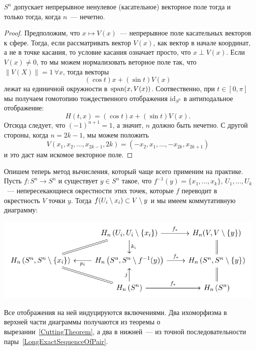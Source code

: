     \begin{theorem}
        $S^n$ допускает непрерывное ненулевое (касательное) векторное поле тогда и только тогда, когда $n$~--- нечетно.
    \end{theorem}
    
    \begin{proof}
        Предположим, что $x \mapsto V(x)$~--- непрерывное поле касательных векторов к сфере. Тогда,
        если рассматривать вектор $V(x)$, как вектор в начале координат, а не в точке касания, то условие касания означает просто, что
        $x \perp V(x)$. Если $V(x) \neq 0$, то мы можем нормализовать веторное поле так, что $\| V(X) \| = 1 \ \forall x$, тогда векторы
        \[ (\cos{t})x  + (\sin{t})V(x) \]
        лежат на единичной окружности в $\Span\lr*{x, V(x)}$.
        Соотвественно, при $t \in [0, \pi]$  мы получаем гомотопию тождественного отображения $\mathrm{id}_{S^n}$ в антиподальное отображение:
        \[ H(t, x) = (\cos{t})x  + (\sin{t})V(x). \]
        Отсюда следует, что $(-1)^{n + 1} = 1$, а значит, $n$ должно быть нечетно. С другой стороны, когда $n = 2k - 1$, мы можем положить
        \[ V(x_1, x_2, \ldots, x_{2k - 1}, 2k) = (-x_2, x_1, \ldots, - x_{2k}, x_{2 k + 1}) \]
        и это даст нам искомое векторное поле.
    \end{proof}

    Опишем теперь метод вычисления, который чаще всего применим на практике.
    Пусть $f\colon S^n \to S^n$ и существует $y \in S^n$ такое, что $f^{-1}(y) = \{ x_1, \ldots, x_k \}$,
    $U_1, \ldots, U_k$~---  непересекающиеся окрестности этих точек, которые $f$ переводит в  окрестность $V$ точки $y$.
    Тогда $f\lr*{U_i \setminus x_i} \subset V \setminus y$ и мы имеем коммутативную диаграмму:
    \begin{center}
        \includegraphics{lectures/0/pictures/cd_10}
    \end{center}

    Все отображения на ней индуцируются включениями. Два ихоморфизма в верхней части диаграммы получаются из теоремы о вырезании~\ref{CuttingTheorem},
    а два в нижней~--- из точной последовательности пары~\ref{LongExactSequenceOfPair}.

